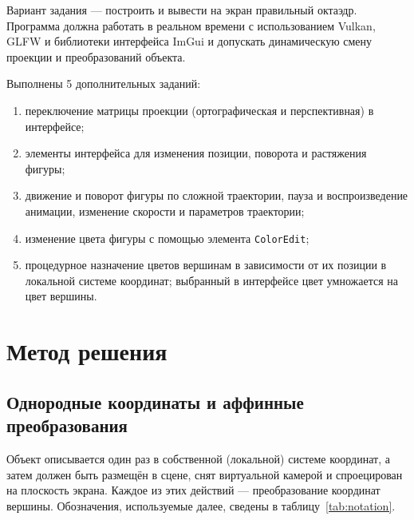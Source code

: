 \documentclass[14pt,a4paper]{extarticle}
\begin{document}
Вариант задания — построить и вывести на экран правильный октаэдр.
Программа должна работать в реальном времени с использованием Vulkan, GLFW и
библиотеки интерфейса ImGui и допускать динамическую смену проекции и
преобразований объекта.

Выполнены 5 дополнительных заданий:

\begin{enumerate}[nosep, leftmargin=*]
	\item переключение матрицы проекции (ортографическая и перспективная) в интерфейсе;
	\item элементы интерфейса для изменения позиции, поворота и растяжения фигуры;
	\item движение и поворот фигуры по сложной траектории, пауза и воспроизведение
	анимации, изменение скорости и параметров траектории;
	\item изменение цвета фигуры с помощью элемента \texttt{ColorEdit};
	\item процедурное назначение цветов вершинам в зависимости от их позиции в
	локальной системе координат; выбранный в интерфейсе цвет умножается на цвет
	вершины.
\end{enumerate}


\section{Метод решения}

\subsection{Однородные координаты и аффинные преобразования}

Объект описывается один раз в собственной (локальной) системе координат, а
затем должен быть размещён в сцене, снят виртуальной камерой и спроецирован на
плоскость экрана. Каждое из этих действий — преобразование координат вершины.
Обозначения, используемые далее, сведены в таблицу~\ref{tab:notation}.
\end{document}
